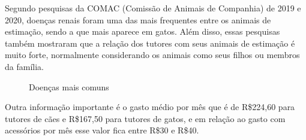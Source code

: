 \documentclass[
	12pt,				%
	openright,			%
	oneside,			%
	a4paper,			%
	english,			%
	french,				%
	spanish,			%
	brazil				%
	]{abntex2}
\begin{document}
Segundo pesquisas da COMAC (Comissão de Animais de Companhia) de 2019 e 2020, doenças renais foram uma das mais frequentes entre os animais de estimação, sendo a que mais aparece em gatos. Além disso, essas pesquisas também mostraram que a relação dos tutores com seus animais de estimação é muito forte, normalmente considerando os animais como seus filhos ou membros da família. \cite{comac}

\begin{figure}[H]
\centering
\caption{Doenças mais comuns}
\quad %
\label{figdoenca}
\end{figure}

Outra informação importante é o gasto médio por mês que é de R\$224,60 para tutores de cães e R\$167,50 para tutores de gatos, e em relação ao gasto com acessórios por mês esse valor fica entre R\$30 e R\$40. \cite{comac}
\end{document}
